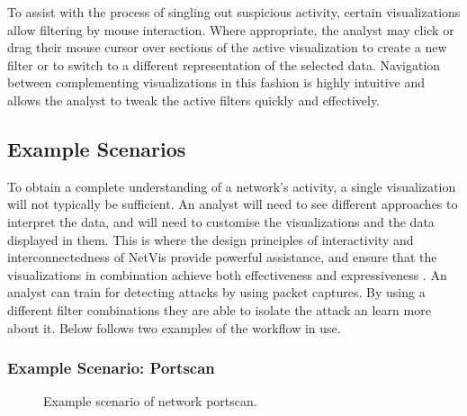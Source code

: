 To assist with the process of singling out suspicious activity, certain visualizations allow
filtering by mouse interaction. Where appropriate, the analyst may click or drag their mouse cursor
over sections of the active visualization to create a new filter or to switch to a different
representation of the selected data. Navigation between complementing visualizations in this fashion
is highly intuitive and allows the analyst to tweak the active filters quickly and effectively.

\subsection{Example Scenarios}
To obtain a complete understanding of a network's activity, a single visualization will not
typically be sufficient. An analyst will need to see different approaches to interpret the data, and
will need to customise the visualizations and the data displayed in them. This is where the design
principles of interactivity and interconnectedness of NetVis provide powerful assistance, and ensure
that the visualizations in combination achieve both effectiveness and expressiveness
\cite{mackinlay1987automatic}. An analyst can train for detecting attacks by using packet captures.
By using a different filter combinations they are able to isolate the attack an learn more about it.
Below follows two examples of the workflow in use.

\subsubsection{Example Scenario: Portscan}
\begin{figure}[htbp!]
	\centering
	\caption{\label{fig:portscan} Example scenario of network portscan.}
\end{figure}

